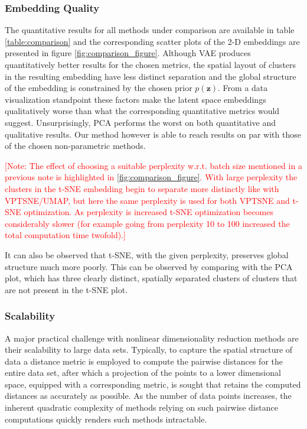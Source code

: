 \subsubsection{Embedding Quality}
\label{subsubsection:embedding_quality}

The quantitative results for all methods under comparison are available in table \ref{table:comparison} and the corresponding scatter plots of the 2-D embeddings are presented in figure \ref{fig:comparison_figure}. Although VAE produces quantitatively better results for the chosen metrics, the spatial layout of clusters in the resulting embedding have less distinct separation and the global structure of the embedding is constrained by the chosen prior $p(\mathbf{z})$. From a data visualization standpoint these factors make the latent space embeddings qualitatively worse than what the corresponding quantitative metrics would suggest. Unsurprisingly, PCA performs the worst on both quantitative and qualitative results. Our method however is able to reach results on par with those of the chosen non-parametric methods.

\noindent \textcolor{red}{[Note: The effect of choosing a suitable perplexity w.r.t. batch size mentioned in a previous note is highlighted in \ref{fig:comparison_figure}. With large perplexity the clusters in the t-SNE embedding begin to separate more distinctly like with VPTSNE/UMAP, but here the same perplexity is used for both VPTSNE and t-SNE optimization. As perplexity is increased t-SNE optimization becomes considerably slower (for example going from perplexity 10 to 100 increased the total computation time twofold).]}

It can also be observed that t-SNE, with the given perplexity, preserves global structure much more poorly. This can be observed by comparing with the PCA plot, which has three clearly distinct, spatially separated clusters of clusters that are not present in the t-SNE plot.

\subsubsection{Scalability}
\label{subsubsection:scalability}

A major practical challenge with nonlinear dimensionality reduction methods are their scalability to large data sets. Typically, to capture the spatial structure of data a distance metric is employed to compute the pairwise distances for the entire data set, after which a projection of the points to a lower dimensional space, equipped with a corresponding metric, is sought that retains the computed distances as accurately as possible. As the number of data points increases, the inherent quadratic complexity of methods relying on such pairwise distance computations quickly renders such methods intractable.

